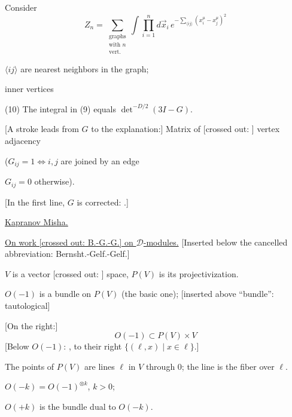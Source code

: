

Consider
\begin{equation*}
Z_n=\sum_{\substack{\text{graphs}\\ \text{with }n\\ \text{vert.}}}
\int\prod_{i=1}^{n}d\vec{x}_i\,
e^{-\sum_{\langle ij\rangle}(x_i^{\mu}-x_j^{\mu})^2}
\tag{9}
\end{equation*}

$\langle ij\rangle$ are nearest neighbors in the graph;

inner vertices

(10) The integral in (9) equals $\det^{-D/2}(3I-G)$.

[A stroke leads from $G$ to the explanation:]
Matrix of [crossed out:
]
vertex adjacency

($G_{ij}=1\Longleftrightarrow i,j$ are joined by an edge

$G_{ij}=0$
otherwise).

[In the first line, $G$ is corrected:
.]

\underline{\underline{Kapranov Misha.}}

\underline{On work [crossed out: B.-G.-G.] on $\mathcal{D}$-modules.}
[Inserted below the cancelled abbreviation: Bernsht.-Gelf.-Gelf.]

$V$ is a vector [crossed out:
]
space, $P(V)$ is its projectivization.

$O(-1)$ is a bundle on $P(V)$ (the basic one);
[inserted above “bundle”: tautological]

[On the right:]
\begin{equation*}
O(-1)\subset P(V)\times V
\end{equation*}
[Below $O(-1)$:
,
to their right $\{(\ell,x)\mid x\in\ell\}$.]

The points of $P(V)$ are lines $\ell$ in $V$ through $0$;
the line is the fiber over $\ell$.

$O(-k)=O(-1)^{\otimes k}$, $k>0$;

$O(+k)$ is the bundle dual to $O(-k)$.

